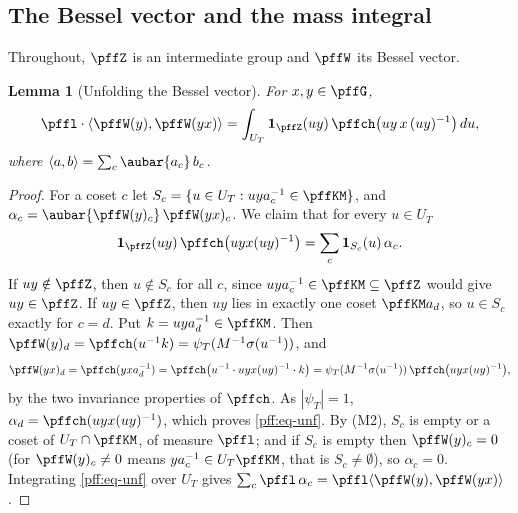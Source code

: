 \documentclass[10pt]{amsart}
\newtheorem{lemma}[theorem]{Lemma}
\theoremstyle{definition}
\theoremstyle{remark}
\begin{document}
\subsection{The Bessel vector and the mass integral}\label{pff:ss-bessel}

Throughout, $\pffZ$ is an intermediate group and $\pffW$ its Bessel vector.

\begin{lemma}[Unfolding the Bessel vector]\label{pff:unfold}
For $x,y\in\pffG$,
\[
\pffl\cdot\langle\pffW(y),\pffW(yx)\rangle=\int_{U_T}\mathbf 1_{\pffZ}(uy)\,\pffch\bigl(uy\,x\,(uy)^{-1}
\bigr)\,du ,
\]
where $\langle a,b\rangle=\sum_c\aubar{a_c}\,b_c$.
\end{lemma}
\begin{proof}
For a coset $c$ let $S_c=\{u\in U_T:uya_c^{-1}\in\pffKM\}$, and $\alpha_c=\aubar{\pffW(y)_c}\,
\pffW(yx)_c$. We claim that for every $u\in U_T$
\begin{equation}\label{pff:eq-unf}
\mathbf 1_{\pffZ}(uy)\,\pffch\bigl(uyx(uy)^{-1}\bigr)=\sum_c\mathbf 1_{S_c}(u)\,\alpha_c .
\end{equation}
If $uy\notin\pffZ$, then $u\notin S_c$ for all $c$, since $uya_c^{-1}\in\pffKM\subseteq\pffZ$ would
give $uy\in\pffZ$. If $uy\in\pffZ$, then $uy$ lies in exactly one coset $\pffKM a_d$, so $u\in S_c$
exactly for $c=d$. Put $k=uya_d^{-1}\in\pffKM$. Then $\pffW(y)_d=\pffch(u^{-1}k)=\psi_T(M^{-1}
\sigma(u^{-1}))$, and
\[
\pffW(yx)_d=\pffch(yxa_d^{-1})=\pffch\bigl(u^{-1}\cdot uyx(uy)^{-1}\cdot k\bigr)=\psi_T(M^{-1}\sigma(
u^{-1}))\,\pffch\bigl(uyx(uy)^{-1}\bigr),
\]
by the two invariance properties of $\pffch$. As $|\psi_T|=1$, $\alpha_d=\pffch(uyx(uy)^{-1})$, which
proves \eqref{pff:eq-unf}. By (M2), $S_c$ is empty or a coset of $U_T\cap\pffKM$, of measure
$\pffl$; and if $S_c$ is empty then $\pffW(y)_c=0$ (for $\pffW(y)_c\ne0$ means $ya_c^{-1}\in
U_T\pffKM$, that is $S_c\ne\emptyset$), so $\alpha_c=0$. Integrating \eqref{pff:eq-unf} over
$U_T$ gives $\sum_c\pffl\,\alpha_c=\pffl\langle\pffW(y),\pffW(yx)\rangle$.
\end{proof}
\end{document}
